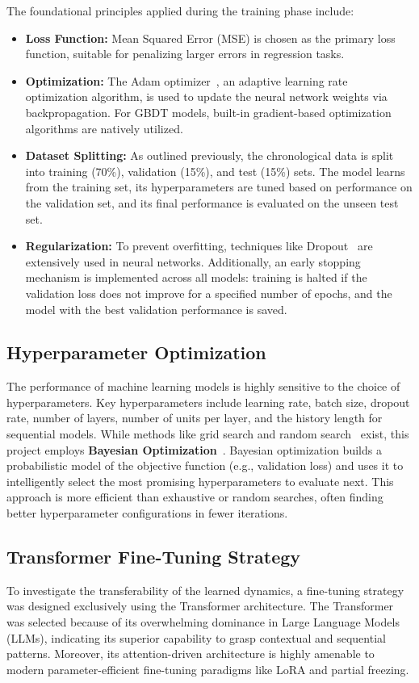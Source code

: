 \documentclass[a4paper]{article}
\begin{document}
The foundational principles applied during the training phase include:
\begin{itemize}
    \item \textbf{Loss Function:} Mean Squared Error (MSE) is chosen as the primary loss function, suitable for penalizing larger errors in regression tasks.
    \item \textbf{Optimization:} The Adam optimizer~\cite{kingma2014adam}, an adaptive learning rate optimization algorithm, is used to update the neural network weights via backpropagation. For GBDT models, built-in gradient-based optimization algorithms are natively utilized.
    \item \textbf{Dataset Splitting:} As outlined previously, the chronological data is split into training (70\%), validation (15\%), and test (15\%) sets. The model learns from the training set, its hyperparameters are tuned based on performance on the validation set, and its final performance is evaluated on the unseen test set.
    \item \textbf{Regularization:} To prevent overfitting, techniques like Dropout~\cite{srivastava2014dropout} are extensively used in neural networks. Additionally, an early stopping mechanism is implemented across all models: training is halted if the validation loss does not improve for a specified number of epochs, and the model with the best validation performance is saved.
\end{itemize}

\subsection{Hyperparameter Optimization}
The performance of machine learning models is highly sensitive to the choice of hyperparameters. Key hyperparameters include learning rate, batch size, dropout rate, number of layers, number of units per layer, and the history length for sequential models. While methods like grid search and random search~\cite{bergstra2012random} exist, this project employs \textbf{Bayesian Optimization}~\cite{snoek2012practical}. Bayesian optimization builds a probabilistic model of the objective function (e.g., validation loss) and uses it to intelligently select the most promising hyperparameters to evaluate next. This approach is more efficient than exhaustive or random searches, often finding better hyperparameter configurations in fewer iterations.

\subsection{Transformer Fine-Tuning Strategy}
To investigate the transferability of the learned dynamics, a fine-tuning strategy was designed exclusively using the Transformer architecture. The Transformer was selected because of its overwhelming dominance in Large Language Models (LLMs), indicating its superior capability to grasp contextual and sequential patterns. Moreover, its attention-driven architecture is highly amenable to modern parameter-efficient fine-tuning paradigms like LoRA and partial freezing.
\end{document}
